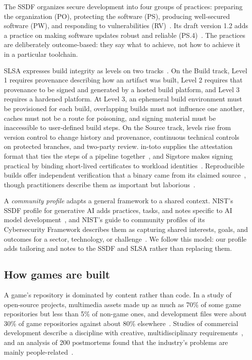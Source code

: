 \documentclass[acmsmall,screen,review]{acmart}
\begin{document}
The SSDF organizes secure development into four groups of practices: preparing the organization (PO), protecting the software (PS), producing well-secured software (PW), and responding to vulnerabilities (RV)~\cite{souppaya2022secure}. Its draft version 1.2 adds a practice on making software updates robust and reliable (PS.4)~\cite{booth2025secure}. The practices are deliberately outcome-based: they say what to achieve, not how to achieve it in a particular toolchain.

SLSA expresses build integrity as levels on two tracks~\cite{openndslsa}. On the Build track, Level 1 requires provenance describing how an artifact was built, Level 2 requires that provenance to be signed and generated by a hosted build platform, and Level 3 requires a hardened platform. At Level 3, an ephemeral build environment must be provisioned for each build, overlapping builds must not influence one another, caches must not be a route for poisoning, and signing material must be inaccessible to user-defined build steps. On the Source track, levels rise from version control to change history and provenance, continuous technical controls on protected branches, and two-party review. in-toto supplies the attestation format that ties the steps of a pipeline together~\cite{torresarias2019toto}, and Sigstore makes signing practical by binding short-lived certificates to workload identities~\cite{newman2022sigstore}. Reproducible builds offer independent verification that a binary came from its claimed source~\cite{lamb2022reproducible}, though practitioners describe them as important but laborious~\cite{fourne2023it}.

A \emph{community profile} adapts a general framework to a shared context. NIST's SSDF profile for generative AI adds practices, tasks, and notes specific to AI model development~\cite{booth2024secure}, and NIST's guide to community profiles of its Cybersecurity Framework describes them as capturing shared interests, goals, and outcomes for a sector, technology, or challenge~\cite{pascoe2024nist}. We follow this model: our profile adds tailoring and notes to the SSDF and SLSA rather than replacing them.


\subsection{How games are built}\label{sec:2.2}

A game's repository is dominated by content rather than code. In a study of open-source projects, multimedia assets made up as much as 70\% of some game repositories but less than 5\% of non-game ones, and development files were about 30\% of game repositories against about 80\% elsewhere~\cite{pascarella2018how}. Studies of commercial development describe a discipline with creative, multidisciplinary requirements~\cite{murphyhill2014cowboys}, and an analysis of 200 postmortems found that the industry's problems are mainly people-related~\cite{politowski2021game}.
\end{document}
